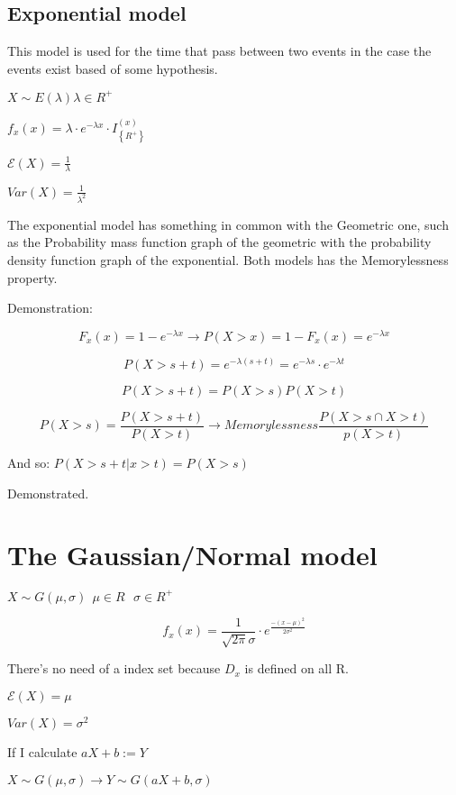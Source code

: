 \documentclass{article}
\begin{document}
\subsection{Exponential model}

This model is used for the time that pass between two events in the case the events exist based of some hypothesis.

$X \sim E(\lambda) \lambda \in R^+$
\bigskip

$f_x(x) = \lambda \cdot e^{- \lambda x} \cdot I_\left\{R^+\right\}^(x)$
\bigskip

$\mathcal E(X) = \frac{1}{\lambda}$

$Var(X) = \frac{1}{\lambda^2}$
\bigskip


The exponential model has something in common with the Geometric one, such as the Probability mass function graph of the geometric with the probability density function graph of the exponential. Both models has the Memorylessness property.
\bigskip

Demonstration:

$$F_x(x) = 1 - e^{-\lambda x} \rightarrow P(X > x) = 1 - F_x(x) = e^{- \lambda x}$$

$$P(X > s + t) = e^{- \lambda (s+t)} = e^{-\lambda s} \cdot e^{- \lambda t}$$

$$P(X > s + t ) = P(X > s)P(X > t)$$

$$P(X>s) = \frac{P(X > s +t )}{P(X > t)} \rightarrow Memorylessness \frac{P(X > s \cap X > t)}{p(X > t)}$$

And so: $P(X > s + t | x > t) = P(X>s)$

Demonstrated.

\section{The Gaussian/Normal model}

$X \sim G(\mu,\sigma) \ \ \mu \in R \ \ \ \sigma \in R^+$

$$f_x(x) = \frac{1}{\sqrt{2\pi}\sigma}\cdot e^{\frac{- (x - \mu)^2}{2\sigma^2}}$$

There's no need of a index set because $D_x$ is defined on all R.

\bigskip

$\mathcal E(X) = \mu$

$Var(X) = \sigma^2$

\bigskip

If I calculate $aX +b:= Y$ 

$X \sim G(\mu,\sigma) \rightarrow Y \sim G(aX +b,\sigma)$
\end{document}

